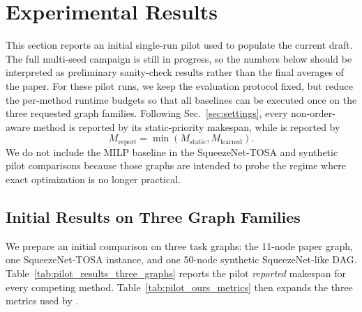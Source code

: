 \section{Experimental Results}
\label{sec:results}
This section reports an initial single-run pilot used to populate the current draft. The full multi-seed campaign is still in progress, so the numbers below should be interpreted as preliminary sanity-check results rather than the final averages of the paper. For these pilot runs, we keep the evaluation protocol fixed, but reduce the per-method runtime budgets so that all baselines can be executed once on the three requested graph families. Following Sec.~\ref{sec:settings}, every non-order-aware method is reported by its static-priority makespan, while \diffgnnorder is reported by
\begin{equation}
M_{\mathrm{report}}=\min(M_{\mathrm{static}},M_{\mathrm{learned}}).
\end{equation}
We do not include the MILP baseline in the SqueezeNet-TOSA and synthetic pilot comparisons because those graphs are intended to probe the regime where exact optimization is no longer practical.

\subsection{Initial Results on Three Graph Families}
We prepare an initial comparison on three task graphs: the 11-node paper graph, one SqueezeNet-TOSA instance, and one 50-node synthetic SqueezeNet-like DAG. Table~\ref{tab:pilot_results_three_graphs} reports the pilot \emph{reported} makespan for every competing method. Table~\ref{tab:pilot_ours_metrics} then expands the three metrics used by \diffgnnorder.

\begin{table}[t]
\centering
\caption{Initial single-run pilot results on three graph families. All entries are reported makespan values. For every baseline, the entry equals $M_{\mathrm{static}}$; for \diffgnnorder, the entry equals $M_{\mathrm{report}}=\min(M_{\mathrm{static}},M_{\mathrm{learned}})$.}
\label{tab:pilot_results_three_graphs}
\scriptsize
{}
\end{table}

